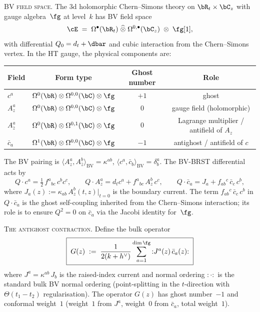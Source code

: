 \begin{construction}
\textsc{BV field space.}
The $3$d holomorphic Chern--Simons theory on
$\bR_t \times \bC_z$ with gauge algebra~$\fg$ at level~$k$
has BV field space
\begin{equation}\label{eq:bv-field-space-hol-cs}
\cE \;=\; \Omega^\bullet(\bR_t)
 \;\widehat{\otimes}\;
 \Omega^{0,\bullet}(\bC_z) \;\otimes\; \fg[1],
\end{equation}
with differential $Q_0 = d_t + \dbar$ and cubic interaction from
the Chern--Simons vertex. In the HT gauge, the physical components
are\textup:
\begin{center}
\renewcommand{\arraystretch}{1.15}
\begin{tabular}{lccc}
 Field & Form type & Ghost number & Role \\
 \hline
 $c^a$ & $\Omega^{0}(\bR)\otimes\Omega^{0,0}(\bC)\otimes\fg$
 & $+1$ & ghost \\
 $A_z^a$ & $\Omega^{0}(\bR)\otimes\Omega^{0,0}(\bC)\otimes\fg$
 & $0$ & gauge field (holomorphic) \\
 $A_{\bar z}^a$ & $\Omega^{0}(\bR)\otimes\Omega^{0,1}(\bC)\otimes\fg$
 & $0$ & Lagrange multiplier / antifield of $A_z$ \\
 $\bar c_a$ & $\Omega^{1}(\bR)\otimes\Omega^{0,0}(\bC)\otimes\fg$
 & $-1$ & antighost / antifield of $c$
\end{tabular}
\end{center}
The BV pairing is
$\langle A_z^a, A_{\bar z}^b\rangle_{\mathrm{BV}}
= \kappa^{ab}$,
$\langle c^a, \bar c_b\rangle_{\mathrm{BV}}
= \delta^a_b$. The BV-BRST differential
acts by
\begin{equation}\label{eq:brst-antighost}
Q \cdot c^a = \tfrac{1}{2}\,f^a{}_{bc}\,c^b c^c,
\qquad
Q \cdot A_z^a = d_t c^a + f^a{}_{bc}\,A_z^b\, c^c,
\qquad
Q \cdot \bar c_a = J_a + f_{ab}{}^c\,\bar c_c\, c^b,
\end{equation}
where $J_a(z) := \kappa_{ab}\,A_z^b(t,z)\big|_{t=0}$ is the
boundary current. The term $f_{ab}{}^c\,\bar c_c\, c^b$ in
$Q \cdot \bar c_a$ is the ghost self-coupling inherited from the
Chern--Simons interaction; its role is to ensure $Q^2 = 0$ on
$\bar c_a$ via the Jacobi identity for~$\fg$.

\textsc{The antighost contraction.}
Define the bulk operator
\begin{equation}\label{eq:antighost-contraction-G}
\boxed{\;
G(z) \;:=\; \frac{1}{2(k + h^\vee)}
 \sum_{a=1}^{\dim\fg}
 {:}J^a(z)\,\bar c_a(z){:}
\;}
\end{equation}
where $J^a = \kappa^{ab}\,J_b$ is the raised-index current and
normal ordering ${:}\cdot{:}$ is the standard bulk BV normal
ordering (point-splitting in the $t$-direction with
$\Theta(t_1 - t_2)$ regularisation).
The operator $G(z)$ has ghost number~$-1$ and conformal weight~$1$
\textup{(}weight~$1$ from $J^a$, weight~$0$ from $\bar c_a$, total
weight~$1$\textup{)}.


\end{construction}
